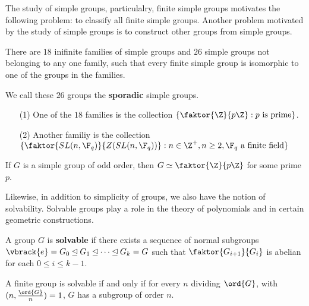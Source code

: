 The study of simple groups, particulalry, finite simple groups motivates the
following problem: to classify all finite simple groups. Another problem
motivated by the study of simple groups is to construct other groups from simple
groups.

\begin{theorem}\label{3.5.3}
    There are $18$ inifinite families of simple groups and $26$ simple groups
    not belonging to any one family, such that every finite simple group is
    isomorphic to one of the groups in the families.
\end{theorem}
\begin{remark}
    We call these $26$ groups the  \textbf{sporadic} simple groups.
\end{remark}

\begin{example}\label{3.10}
    \begin{enumerate}
        \item[(1)] One of the $18$ families is the collection
            $\{\faktor{\Z}{p\Z} : p \text{ is prime}\}$.

        \item[(2)] Another familiy is the collection $\{\faktor{SL(n,\F_q)}{Z(SL(n,
            \F_q))} : n \in \Z^+, n \geq 2,\F_q \text{ a finite field} \}$
    \end{enumerate}
\end{example}

\begin{theorem}\label{3.5.4}
    If $G$ is a simple group of odd order, then $G \simeq \faktor{\Z}{p\Z}$ for
    some prime $p$.
\end{theorem}

Likewise, in addition to simplicity of groups, we also have the notion of
solvability. Solvable groups play a role in the theory of polynomials and in
certain geometric constructions.

\begin{definition}
    A group $G$ is \textbf{solvable} if there exists a sequence of normal
    subgroups $\vbrack{e}=G_0 \unlhd G_1 \unlhd \dots \unlhd G_k=G$ such that
    $\faktor{G_{i+1}}{G_i}$ is abelian for each $0 \leq i \leq k-1$.
\end{definition}

\begin{theorem}\label{3.5.5}
    A finite group is solvable if and only if for every $n$ dividing $\ord{G}$,
    with $(n,\frac{\ord{G}}{n})=1$, $G$ has a subgroup of order $n$.
\end{theorem}

